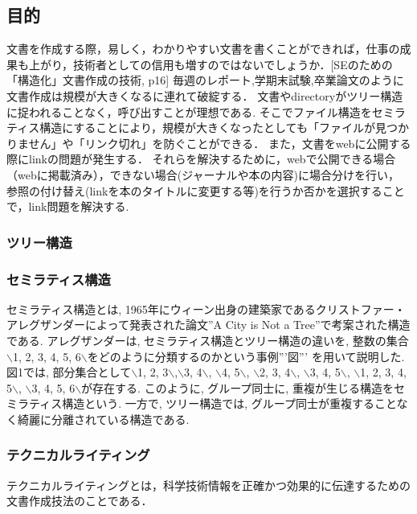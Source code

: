\documentclass[11pt]{article}
\begin{document}
\subsection{目的}
\label{sec:org834ec2f}
文書を作成する際，易しく，わかりやすい文書を書くことができれば，仕事の成果も上がり，技術者としての信用も増すのではないでしょうか．[SEのための「構造化」文書作成の技術, p16]
毎週のレポート,学期末試験,卒業論文のように文書作成は規模が大きくなるに連れて破綻する．
文書やdirectoryがツリー構造に捉われることなく，呼び出すことが理想である.
そこでファイル構造をセミラティス構造にすることにより，規模が大きくなったとしても「ファイルが見つかりません」や「リンク切れ」を防ぐことができる．
また，文書をwebに公開する際にlinkの問題が発生する．
それらを解決するために，webで公開できる場合（webに掲載済み），できない場合(ジャーナルや本の内容)に場合分けを行い，
参照の付け替え(linkを本のタイトルに変更する等)を行うか否かを選択することで，link問題を解決する.


\subsubsection{ツリー構造}
\label{sec:org62ade77}

\subsubsection{セミラティス構造}
\label{sec:orgbfd7c98}
セミラティス構造とは, 1965年にウィーン出身の建築家であるクリストファー・アレグザンダーによって発表された論文''A City is Not a Tree''で考案された構造である. アレグザンダーは, セミラティス構造とツリー構造の違いを, 整数の集合$\backslash${1, 2, 3, 4, 5, 6$\backslash$}をどのように分類するのかという事例'''図''' を用いて説明した. 図1では, 部分集合として$\backslash${1, 2, 3$\backslash$},$\backslash${3, 4$\backslash$}, $\backslash${4, 5$\backslash$}, $\backslash${2, 3, 4$\backslash$}, $\backslash${3, 4, 5$\backslash$}, $\backslash${1, 2, 3, 4, 5$\backslash$}, $\backslash${3, 4, 5, 6$\backslash$}が存在する. このように, グループ同士に, 重複が生じる構造をセミラティス構造という. 一方で, ツリー構造では, グループ同士が重複することなく綺麗に分離されている構造である.


\subsubsection{テクニカルライティング}
\label{sec:org220a029}
テクニカルライティングとは，科学技術情報を正確かつ効果的に伝達するための文書作成技法のことである．
\end{document}
